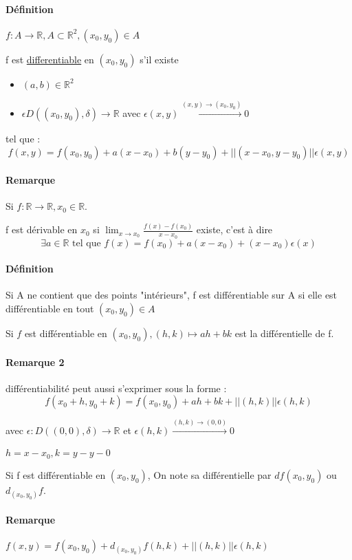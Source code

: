 \paragraph{Définition} $f:A \rightarrow \mathbb{R}, A \subset \mathbb{R}^2, (x_0, y_0) \in A$

f est \ul{differentiable} en $(x_0, y_0)$ s'il existe \begin{itemize}
	\item $(a, b)  \in \mathbb{R}^2$
	\item $\epsilon D((x_0, y_0), \delta) \rightarrow \mathbb{R}$ avec $\epsilon(x, y) \xrightarrow[]{(x, y) \to (x_0, y_0)} 0$
\end{itemize}

tel que : \[f(x, y) = f(x_0, y_0) + a(x-x_0) + b(y-y_0) + ||(x-x_0, y-y_0)|| \epsilon(x, y)\]

\paragraph{Remarque} Si $f : \mathbb{R} \rightarrow \mathbb{R}, x_0 \in \mathbb{R}$. 

f est dérivable en $x_0$ si $\lim_{x \to x_0} \frac{f(x) - f(x_0)}{x-x_0}$ existe, c'est à dire \[\exists a \in \mathbb{R} \text{ tel que } f(x) = f(x_0) + a(x-x_0) + (x-x_0) \epsilon(x)\]

\paragraph{Définition}
Si A ne contient que des points "intérieurs", f est différentiable sur A si elle est différentiable en tout $(x_0, y_0) \in A$

Si $f$ est différentiable en $(x_0, y_0), (h, k) \mapsto ah + bk$ est la différentielle de f.

\paragraph{Remarque 2} différentiabilité peut aussi s'exprimer sous la forme : \[f(x_0+h, y_0+k) = f(x_0, y_0) + ah+bk + ||(h, k)|| \epsilon(h, k)\]

avec $\epsilon : D((0, 0), \delta) \to \mathbb{R}$ et $\epsilon(h, k) \xrightarrow[]{(h, k) \to (0, 0)} 0$

$h = x-x_0, k=y-y-0$

Si f est différentiable en $(x_0, y_0)$, On note sa différentielle par $df(x_0, y_0)$ ou $d_{(x_0, y_0)}f$.

\paragraph{Remarque} $f(x, y) = f(x_0, y_0) + d_{(x_0, y_0)}f(h, k) + ||(h, k)||\epsilon(h, k)$

